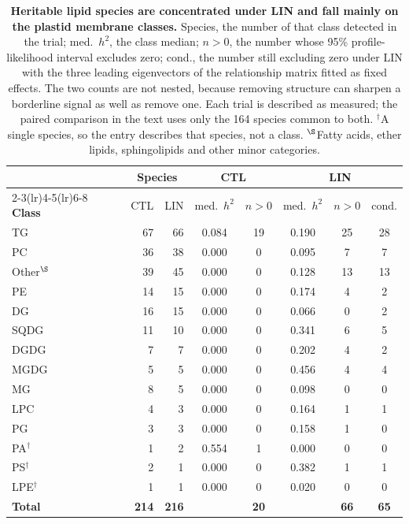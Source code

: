\documentclass[9pt,twocolumn,twoside]{rilabRxiv}
\begin{document}
\begin{table}[!ht]
\centering
\caption{\textbf{Heritable lipid species are concentrated under LIN and fall mainly
on the plastid membrane classes.} Species, the number of that class detected in the
trial; med.\ $h^2$, the class median; $n{>}0$, the number whose 95\%
profile-likelihood interval excludes zero; cond., the number still excluding zero
under LIN with the three leading eigenvectors of the relationship matrix fitted as
fixed effects. The two counts are not nested, because removing structure can sharpen
a borderline signal as well as remove one. Each trial is described as measured; the
paired comparison in the text uses only the 164 species common to both.
$^{\dagger}$A single species, so the entry describes that species, not a class.
$^{\S}$Fatty acids, ether lipids, sphingolipids and other minor categories.}
\label{tab:species_heritability}
\small
\setlength{\tabcolsep}{4pt}
\begin{tabular}{lrrccccc}
\toprule
& \multicolumn{2}{c}{\textbf{Species}} & \multicolumn{2}{c}{\textbf{CTL}} & \multicolumn{3}{c}{\textbf{LIN}} \\
\cmidrule(lr){2-3}\cmidrule(lr){4-5}\cmidrule(lr){6-8}
\textbf{Class} & CTL & LIN & med.\ $h^2$ & $n{>}0$ & med.\ $h^2$ & $n{>}0$ & cond. \\
\midrule
TG & 67 & 66 & 0.084 & 19 & 0.190 & 25 & 28 \\
PC & 36 & 38 & 0.000 & 0 & 0.095 & 7 & 7 \\
Other$^{\S}$ & 39 & 45 & 0.000 & 0 & 0.128 & 13 & 13 \\
PE & 14 & 15 & 0.000 & 0 & 0.174 & 4 & 2 \\
DG & 16 & 15 & 0.000 & 0 & 0.066 & 0 & 2 \\
SQDG & 11 & 10 & 0.000 & 0 & 0.341 & 6 & 5 \\
DGDG & 7 & 7 & 0.000 & 0 & 0.202 & 4 & 2 \\
MGDG & 5 & 5 & 0.000 & 0 & 0.456 & 4 & 4 \\
MG & 8 & 5 & 0.000 & 0 & 0.098 & 0 & 0 \\
LPC & 4 & 3 & 0.000 & 0 & 0.164 & 1 & 1 \\
PG & 3 & 3 & 0.000 & 0 & 0.158 & 1 & 0 \\
PA$^{\dagger}$ & 1 & 2 & 0.554 & 1 & 0.000 & 0 & 0 \\
PS$^{\dagger}$ & 2 & 1 & 0.000 & 0 & 0.382 & 1 & 1 \\
LPE$^{\dagger}$ & 1 & 1 & 0.000 & 0 & 0.020 & 0 & 0 \\
\midrule
\textbf{Total} & \textbf{214} & \textbf{216} & & \textbf{20} & & \textbf{66} & \textbf{65} \\
\bottomrule
\end{tabular}
\end{table}
\end{document}
